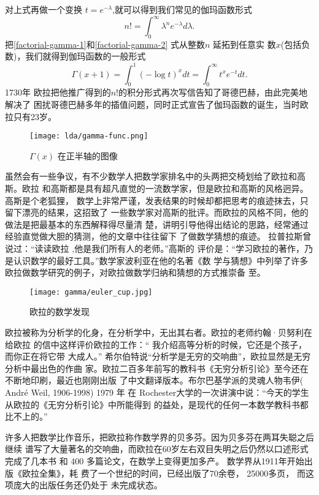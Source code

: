 对上式再做一个变换 $t=e^{-\lambda}$,就可以得到我们常见的伽玛函数形式
\begin{equation}
\label{factorial-gamma-2}
 n! = \int_0^{\infty} \lambda^ne^{-\lambda}d\lambda .
\end{equation}
把\eqref{factorial-gamma-1}和\eqref{factorial-gamma-2} 式从整数$n$ 延拓到任意实
数$x$(包括负数)，我们就得到伽玛函数的一般形式
$$ \Gamma(x+1) = \int_0^1 (-\log t)^{x}dt =  \int_0^{\infty} t^{x}e^{-t}dt .$$
1730年 欧拉把他推广得到的$n!$的积分形式再次写信告知了哥德巴赫，由此完美地解决了
困扰哥德巴赫多年的插值问题，同时正式宣告了伽玛函数的诞生，当时欧拉只有23岁。
\begin{figure}[htbp]
\centering
\texttt{[image: lda/gamma-func.png]}
\caption{$\Gamma(x)$ 在正半轴的图像}
\end{figure}

虽然会有一些争议，有不少数学人把数学家排名中的头两把交椅划给了欧拉和高斯。欧拉
和高斯都是具有超凡直觉的一流数学家，但是欧拉和高斯的风格迥异。高斯是个老狐狸，
数学上非常严谨，发表结果的时候却都把思考的痕迹抹去，只留下漂亮的结果，这招致了
一些数学家对高斯的批评。而欧拉的风格不同，他的做法是把最基本的东西解释得尽量清
楚，讲明引导他得出结论的思路，经常通过经验直觉做大胆的猜测，他的文章中往往留下
了做数学猜想的痕迹。 拉普拉斯曾说过：“读读欧拉 ,他是我们所有人的老师。”高斯的
评价是：“学习欧拉的著作，乃是认识数学的最好工具。”数学家波利亚在他的名著《数
学与猜想》中列举了许多欧拉做数学研究的例子，对欧拉做数学归纳和猜想的方式推崇备
至。

\begin{figure}[htbp]
\centering
\texttt{[image: gamma/euler\_cup.jpg]}
\caption{欧拉的数学发现}
\end{figure}

欧拉被称为分析学的化身，在分析学中，无出其右者。欧拉的老师约翰·贝努利在给欧拉
的信中这样评价欧拉的工作：“ 我介绍高等分析的时候，它还是个孩子，而你正在将它带
大成人。” 希尔伯特说“分析学是无穷的交响曲”，欧拉显然是无穷分析中最出色的作曲
家。欧拉二百多年前写的教科书《无穷分析引论》至今还在不断地印刷，最近也刚刚出版
了中文翻译版本。布尔巴基学派的灵魂人物韦伊( Andr\'{e} Weil, 1906-1998) 1979 年
在 Rochester大学的一次讲演中说：“今天的学生从欧拉的《无穷分析引论》中所能得到
的益处，是现代的任何一本数学教科书都比不上的。”

许多人把数学比作音乐，把欧拉称作数学界的贝多芬。因为贝多芬在两耳失聪之后继续
谱写了大量著名的交响曲，而欧拉在60岁左右双目失明之后仍然以口述形式完成了几本书
和 400 多篇论文，在数学上变得更加多产。 数学界从1911年开始出版《欧拉全集》，耗
费了一个世纪的时间，已经出版了70余卷， 25000多页， 而这项庞大的出版任务还仍处于
未完成状态。

